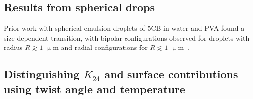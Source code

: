 \subsection{Results from spherical drops}
Prior work with spherical emulsion droplets of 5CB in water and PVA found a size dependent transition, with bipolar configurations observed for droplets with radius $R \gtrsim 1$ $\upmu$m and radial configurations for $R \lesssim 1$ $\upmu$m~\cite{miller2013influence}.
\subsection{Distinguishing $K_{24}$ and surface contributions using twist angle and temperature}

